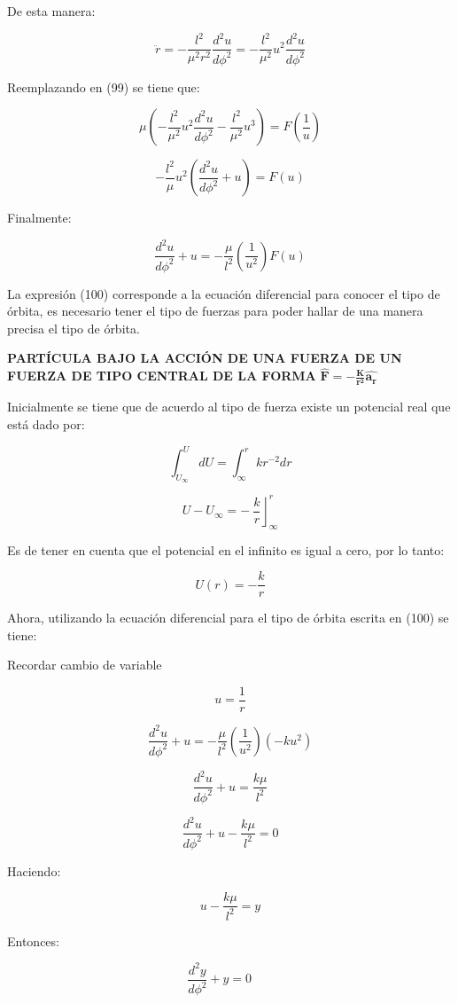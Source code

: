 \documentclass[]{article}
\begin{document}
De esta manera:

\[\ddot{r} = - \frac{l^{2}}{\mu^{2}r^{2}}\frac{d^{2}u}{d\phi^{2}} = - \frac{l^{2}}{\mu^{2}}u^{2}\frac{d^{2}u}{d\phi^{2}}\]

Reemplazando en (99) ­­se tiene que:

\[\mu\left( - \frac{l^{2}}{\mu^{2}}u^{2}\frac{d^{2}u}{d\phi^{2}} - \frac{l^{2}}{\mu^{2}}u^{3} \right) = F\left( \frac{1}{u} \right)\]

\[- \frac{l^{2}}{\mu}u^{2}\left( \frac{d^{2}u}{d\phi^{2}} + u \right) = F(u)\]

Finalmente:

\[\frac{d^{2}u}{d\phi^{2}} + u = - \frac{\mu}{l^{2}}\left( \frac{1}{u^{2}} \right)F(u)\]

La expresión (100) corresponde a la ecuación diferencial para conocer el
tipo de órbita, es necesario tener el tipo de fuerzas para poder hallar
de una manera precisa el tipo de órbita.

\textbf{PARTÍCULA BAJO LA ACCIÓN DE UNA FUERZA DE UN FUERZA DE TIPO
CENTRAL DE LA FORMA}
\(\widehat{\mathbf{F}}\mathbf{= -}\frac{\mathbf{K}}{\mathbf{r}^{\mathbf{2}}}\widehat{\mathbf{a}_{\mathbf{r}}}\)

Inicialmente se tiene que de acuerdo al tipo de fuerza existe un
potencial real que está dado por:

\[\int_{U_{\infty}}^{U}{dU} = \int_{\infty}^{r}{kr^{- 2}}dr\]

\[U - U_{\infty} = - \left. \ \frac{k}{r} \right\rfloor_{\infty}^{r}\]

Es de tener en cuenta que el potencial en el infinito es igual a cero,
por lo tanto:

\[U(r) = - \frac{k}{r}\]

Ahora, utilizando la ecuación diferencial para el tipo de órbita escrita
en (100) se tiene:

Recordar cambio de variable \(
\)

\[u = \frac{1}{r}\]

\[\frac{d^{2}u}{d\phi^{2}} + u = - \frac{\mu}{l^{2}}\left( \frac{1}{u^{2}} \right)\left( - ku^{2} \right)\]

\[\frac{d^{2}u}{d\phi^{2}} + u = \frac{k\mu}{l^{2}}\]

\[\frac{d^{2}u}{d\phi^{2}} + u - \frac{k\mu}{l^{2}} = 0\]

Haciendo:

\[u - \frac{k\mu}{l^{2}} = y\]

Entonces:

\[\frac{d^{2}y}{d\phi^{2}} + y = 0\ \ \ \ \ \ \ \ \]
\end{document}
